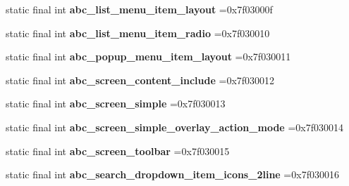 \begin{DoxyCompactItemize}
\mbox{\label{classproject4_1_1xaria_1_1R_1_1layout_ae61b36034dcd2e08e45f673bb4380847}} 
static final int {\bfseries abc\+\_\+list\+\_\+menu\+\_\+item\+\_\+layout} =0x7f03000f
\item 
\mbox{\label{classproject4_1_1xaria_1_1R_1_1layout_a83c9282db6211a48ebbf3a07c574c812}} 
static final int {\bfseries abc\+\_\+list\+\_\+menu\+\_\+item\+\_\+radio} =0x7f030010
\item 
\mbox{\label{classproject4_1_1xaria_1_1R_1_1layout_a0be094f8e151851df6453a42e5d76a39}} 
static final int {\bfseries abc\+\_\+popup\+\_\+menu\+\_\+item\+\_\+layout} =0x7f030011
\item 
\mbox{\label{classproject4_1_1xaria_1_1R_1_1layout_af6851190b38bb1d859a311ac225098b5}} 
static final int {\bfseries abc\+\_\+screen\+\_\+content\+\_\+include} =0x7f030012
\item 
\mbox{\label{classproject4_1_1xaria_1_1R_1_1layout_a895da2d58d90a9f25026eb74d5cd083f}} 
static final int {\bfseries abc\+\_\+screen\+\_\+simple} =0x7f030013
\item 
\mbox{\label{classproject4_1_1xaria_1_1R_1_1layout_a2a32679b66d8d47a199f2adfb2ae8fe8}} 
static final int {\bfseries abc\+\_\+screen\+\_\+simple\+\_\+overlay\+\_\+action\+\_\+mode} =0x7f030014
\item 
\mbox{\label{classproject4_1_1xaria_1_1R_1_1layout_a0da1edfdea09a03468b06328bfa2f40f}} 
static final int {\bfseries abc\+\_\+screen\+\_\+toolbar} =0x7f030015
\item 
\mbox{\label{classproject4_1_1xaria_1_1R_1_1layout_a719538c11b97872353e9a855afc1541f}} 
static final int {\bfseries abc\+\_\+search\+\_\+dropdown\+\_\+item\+\_\+icons\+\_\+2line} =0x7f030016
\item 
\mbox{\label{classproject4_1_1xaria_1_1R_1_1layout_addd96b11fab438718196b90e9cfdc023}} 

\end{DoxyCompactItemize}
